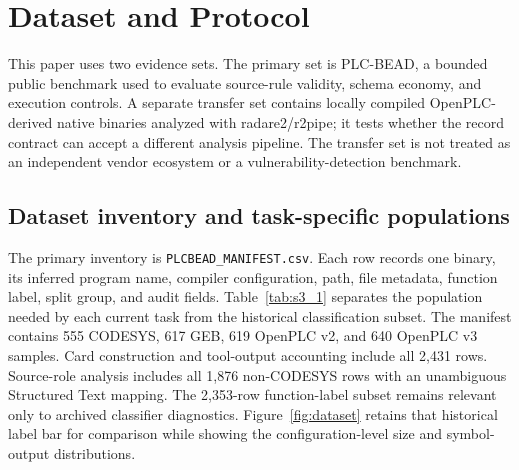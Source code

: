 \documentclass[manuscript,screen,review]{acmart}
\begin{document}

\section{Dataset and Protocol}

This paper uses two evidence sets. The primary set is PLC-BEAD, a bounded public benchmark used to evaluate source-rule validity, schema economy, and execution controls. A separate transfer set contains locally compiled OpenPLC-derived native binaries analyzed with radare2/r2pipe; it tests whether the record contract can accept a different analysis pipeline. The transfer set is not treated as an independent vendor ecosystem or a vulnerability-detection benchmark.

\subsection{Dataset inventory and task-specific populations}

The primary inventory is \texttt{PLCBEAD\_MANIFEST.csv}. Each row records one binary, its inferred program name, compiler configuration, path, file metadata, function label, split group, and audit fields. Table~\ref{tab:s3_1} separates the population needed by each current task from the historical classification subset. The manifest contains 555 CODESYS, 617 GEB, 619 OpenPLC v2, and 640 OpenPLC v3 samples. Card construction and tool-output accounting include all 2{,}431 rows. Source-role analysis includes all 1{,}876 non-CODESYS rows with an unambiguous Structured Text mapping. The 2{,}353-row function-label subset remains relevant only to archived classifier diagnostics. Figure~\ref{fig:dataset} retains that historical label bar for comparison while showing the configuration-level size and symbol-output distributions.
\end{document}
